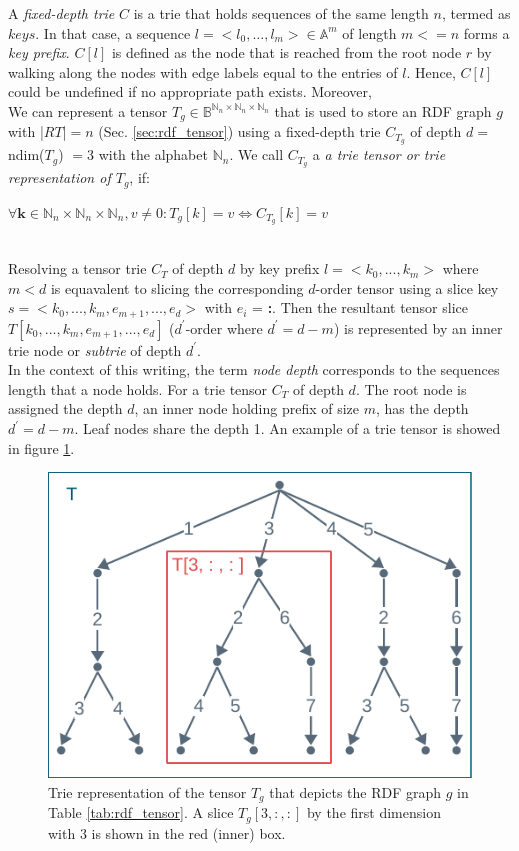 A \textit{fixed-depth trie} $C$ is a trie that holds sequences of the same length $n$, termed as $keys$. In that case, a sequence $l = <l_0, … , l_m> \in \mathbb{A}^m$ of length $m <= n$ forms a \textit{key prefix}. $C[l]$ is defined as the node that is reached from the root node $r$ by walking along the nodes with edge labels equal to the entries of $l$. Hence, $C[l]$ could be undefined if no appropriate path exists. Moreover, \\

We can represent a tensor $T_g \in \mathbb{B}^{\mathbb{N}_n \times \mathbb{N}_n \times \mathbb{N}_n}$ that is used to store an RDF graph $g$ with |$RT$|$=n$ (Sec. \ref{sec:rdf_tensor}) using a fixed-depth trie $C_{T_g}$ of depth $d = $ ndim($T_g$) $=3$ with the alphabet $\mathbb{N}_n$. We call $C_{T_g}$ a \textit{a trie tensor or trie representation of $T_g$}, if: \\
\centerline{$\forall \textbf{k} \in \mathbb{N}_n \times \mathbb{N}_n \times \mathbb{N}_n, v \neq 0: T_g[k] = v \iff C_{T_g}[k] = v$}\\

Resolving a tensor trie $C_T$ of depth $d$ by key prefix $l = <k_0, ..., k_m>$ where $m<d$ is equavalent to slicing the corresponding $d$-order tensor using a slice key $s = <k_0, ..., k_m, e_{m+1}, ...,e_d>$ with $e_i$ = \textbf{:}. Then the resultant tensor slice $T[k_0, ..., k_m, e_{m+1}, ...,e_d]$ ($d^{'}$-order where $d^{'}=d-m$) is represented by an inner trie node or \textit{subtrie} of depth $d^{'}$. \\

In the context of this writing, the term \textit{node depth} corresponds to the sequences length that a node holds. For a trie tensor $C_T$ of depth $d$. The root node is assigned the depth $d$, an inner node holding prefix of size $m$, has the depth $d^{'}=d-m$. Leaf nodes share the depth 1. An example of a trie tensor is showed in figure \ref{fig:rdf_trie}.  \\

\begin{figure}[h]
	\centering
	\includegraphics{figures/chapter2/trie4}
	\caption{Trie representation of the tensor $T_g$ that depicts the RDF graph $g$ in  Table \ref{tab:rdf_tensor}. A slice $T_g[3, :, :]$ by the first dimension with 3 is shown in the red (inner) box.}
	\label{fig:rdf_trie}
\end{figure}
\clearpage


